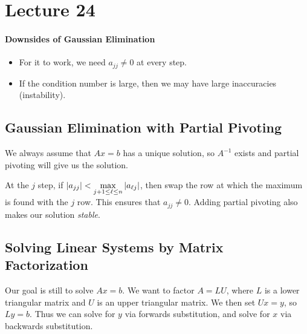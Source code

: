 \documentclass[class=article, crop=false]{standalone}
\begin{document}
  \section{Lecture 24}
  \paragraph{Downsides of Gaussian Elimination}
  \begin{itemize}
    \item For it to work, we need $a_{jj} \neq 0$ at every step.
    \item If the condition number is large, then we may have large inaccuracies (instability).
  \end{itemize}
  \subsection{Gaussian Elimination with Partial Pivoting}
  We always assume that $Ax = b$ has a unique solution, so $A^{-1}$ exists and partial pivoting will give us the solution. \par
  At the $j$ step, if $\left\lvert a_{jj} \right\rvert < \max\limits_{j + 1 \leq \ell \leq n}\left\lvert a_{\ell j} \right\rvert$, then swap the row at which the maximum is found with the $j$ row. This ensures that $a_{jj}\neq 0$. Adding partial pivoting also makes our solution \emph{stable}.
  \subsection{Solving Linear Systems by Matrix Factorization}
  Our goal is still to solve $Ax = b$. We want to factor $A = LU$, where $L$ is a lower triangular matrix and $U$ is an upper triangular matrix. We then set $Ux = y$, so $Ly = b$. Thus we can solve for $y$ via forwards substitution, and solve for $x$ via backwards substitution.
\end{document}
